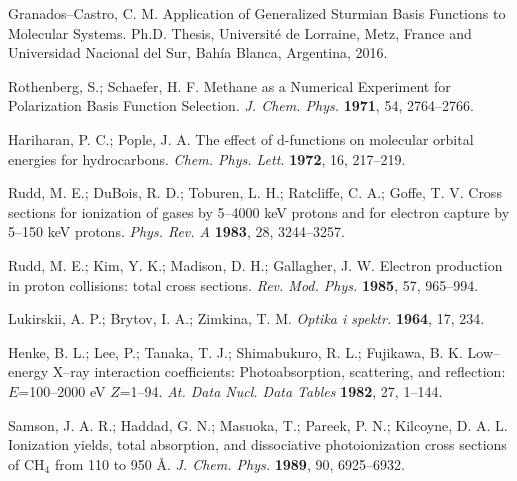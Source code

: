 \documentclass[10pt]{article}
\begin{document}
\begin{thebibliography}{10}
Granados--Castro, C. M.
Application of Generalized Sturmian Basis Functions to Molecular Systems.
Ph.D. Thesis, Universit\'e de Lorraine, Metz, France and 
Universidad Nacional del Sur, Bah\'ia Blanca, Argentina, 2016.

Rothenberg, S.; Schaefer, H. F.
Methane as a Numerical Experiment for Polarization Basis Function Selection.
{\it J. Chem. Phys.} {\bf 1971}, 54, 2764--2766.

Hariharan, P. C.; Pople, J. A.
The effect of d-functions on molecular orbital energies for hydrocarbons.
{\it Chem. Phys. Lett.} {\bf 1972}, 16, 217--219.

Rudd, M. E.; DuBois, R. D.; Toburen, L. H.; Ratcliffe, C. A.; Goffe, T. V.
Cross sections for ionization of gases by 5--4000 keV protons and for electron capture by 5--150 keV protons.
{\it Phys. Rev. A} {\bf 1983}, 28, 3244--3257.

Rudd, M. E.; Kim, Y. K.; Madison, D. H.; Gallagher, J. W.
Electron production in proton collisions: total cross sections.
{\it Rev. Mod. Phys.} {\bf 1985}, 57, 965--994.

Lukirskii, A. P.; Brytov, I. A.; Zimkina, T. M.
{\it Optika i spektr.} {\bf 1964}, 17, 234.

Henke, B. L.; Lee, P.; Tanaka, T. J.; Shimabukuro, R. L.; Fujikawa, B. K.
Low--energy X--ray interaction coefficients: Photoabsorption, scattering, and reflection: $E$=100--2000 eV $Z$=1--94.
{\it At. Data Nucl. Data Tables} {\bf 1982}, 27, 1--144.

Samson, J. A. R.; Haddad, G. N.; Masuoka, T.; Pareek, P. N.; Kilcoyne, D. A. L.
Ionization yields, total absorption, and dissociative photoionization cross sections of CH$_4$ from 110 to 950 \AA.
{\it J. Chem. Phys.} {\bf 1989}, 90, 6925--6932.

\end{thebibliography}
\end{document}
